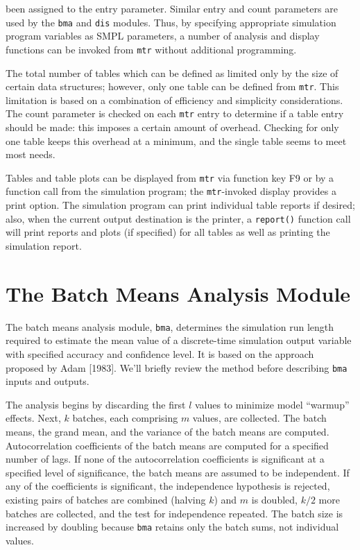 \noindent been assigned to the entry parameter. Similar entry and count parameters
are used by the \texttt{bma} and \texttt{dis} modules. Thus, by specifying appropriate
simulation program variables as SMPL parameters, a number of analysis and
display functions can be invoked from \texttt{mtr} without additional programming.

The total number of tables which can be defined as limited only by the
size of certain data structures; however, only one table can be defined from
\texttt{mtr}. This limitation is based on a combination of efficiency and simplicity
considerations. The count parameter is checked on each \texttt{mtr} entry to
determine if a table entry should be made: this imposes a certain amount of
overhead. Checking for only one table keeps this overhead at a minimum,
and the single table seems to meet most needs.

Tables and table plots can be displayed from \texttt{mtr} via function key F9 or
by a function call from the simulation program; the \texttt{mtr}-invoked display
provides a print option. The simulation program can print individual table
reports if desired; also, when the current output destination is the printer, a
\texttt{report()} function call will print reports and plots (if specified) for all
tables as well as printing the simulation report.

\section{The Batch Means Analysis Module}
\label{sec:simenv-bma}

The batch means analysis module, \texttt{bma}, determines the simulation run
length required to estimate the mean value of a discrete-time simulation
output variable with specified accuracy and confidence level. It is based on
the approach proposed by Adam [1983]. We'll briefly review the method
before describing \texttt{bma} inputs and outputs.

The analysis begins by discarding the first $l$ values to minimize model
``warmup'' effects. Next, $k$ batches, each comprising $m$ values, are collected.
The batch means, the grand mean, and the variance of the batch means are
computed. Autocorrelation coefficients of the batch means are computed for a
specified number of lags. If none of the autocorrelation coefficients is
significant at a specified level of significance, the batch means are assumed
to be independent. If any of the coefficients is significant, the independence
hypothesis is rejected, existing pairs of batches are combined (halving $k$)
and $m$ is doubled, $k/2$ more batches are collected, and the test for independence
repeated. The batch size is increased by doubling because \texttt{bma} retains
only the batch sums, not individual values.

